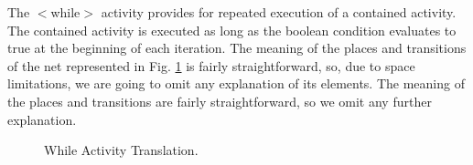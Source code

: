 The $<$while$>$ activity provides for repeated execution of a contained activity. The contained 
activity is executed as long as the boolean condition evaluates to true at the beginning of 
each iteration. The meaning of the places and transitions of the net represented in Fig. \ref{while} is fairly straightforward, so, due to space limitations, we are going to omit any explanation of its elements. 
The meaning of the places and transitions are fairly straightforward, so we omit any further explanation.

\begin{figure}[!ht]
\begin{center}
\end{center}
\caption{\label{while} While Activity Translation.}
\vspace{-0.7cm}
\end{figure}
\vspace{-0.5cm}
\newpage
